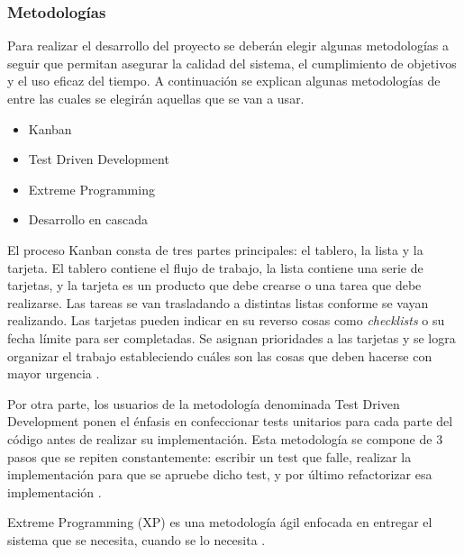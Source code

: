 \documentclass{article}
\begin{document}
\subsubsection{Metodologías}
Para realizar el desarrollo del proyecto se deberán elegir algunas metodologías a seguir que permitan asegurar la calidad del sistema, el cumplimiento de objetivos y el uso eficaz del tiempo. A continuación se explican algunas metodologías de entre las cuales se elegirán aquellas que se van a usar.
\begin{itemize}
    \item Kanban
    \item Test Driven Development
    \item Extreme Programming
    \item Desarrollo en cascada
\end{itemize}
El proceso Kanban consta de tres partes principales: el tablero, la lista y la tarjeta. El tablero contiene el flujo de trabajo, la lista contiene una serie de tarjetas, y la tarjeta es un producto que debe crearse o una tarea que debe realizarse. Las tareas se van trasladando a distintas listas conforme se vayan realizando. Las tarjetas pueden indicar en su reverso cosas como \textit{checklists} o su fecha límite para ser completadas. Se asignan prioridades a las tarjetas y se logra organizar el trabajo estableciendo cuáles son las cosas que deben hacerse con mayor urgencia \parencite{completeGuideAgile}.

Por otra parte, los usuarios de la metodología denominada Test Driven Development ponen el énfasis en confeccionar tests unitarios para cada parte del código antes de realizar su implementación. Esta metodología se compone de 3 pasos que se repiten constantemente: escribir un test que falle, realizar la implementación para que se apruebe dicho test, y por último refactorizar esa implementación \parencite[pp. 19-20]{testingJavascript}.

Extreme Programming (XP) es una metodología ágil enfocada en entregar el sistema que se necesita, cuando se lo necesita \parencite{xp}.
\end{document}

